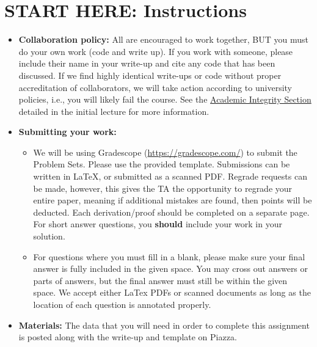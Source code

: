 \documentclass[11pt,addpoints,answers]{exam}
\numberwithin{equation}{section} %
\numberwithin{figure}{section} %
\numberwithin{table}{section} %
\begin{document}
\section*{START HERE: Instructions}
\begin{itemize}
    \item \textbf{Collaboration policy:} All are encouraged to work together, BUT you must do your own work (code and write up). If you work with someone, please include their name in your write-up and cite any code that has been discussed. If we find highly identical write-ups or code without proper accreditation of collaborators, we will take action according to university policies, i.e., you will likely fail the course. See the \href{https://www.dropbox.com/s/z6o0tinc9eaez46/L01_Overview.pdf?dl=0}{Academic Integrity Section} detailed in the initial lecture for more information.
          \item\textbf{Submitting your work:}
          \begin{itemize}
              \item We will be using Gradescope (\url{https://gradescope.com/}) to submit the Problem Sets. Please use the provided template. Submissions can be written in LaTeX, or submitted as a scanned PDF. Regrade requests can be made, however, this gives the TA the opportunity to regrade your entire paper, meaning if additional mistakes are found, then points will be deducted.
                    Each derivation/proof should be  completed on a separate page. For short answer questions, you \textbf{should} include your work in your solution.
              \item For questions where you must fill in a blank, please make sure your final answer is fully included in the given space. You may cross out answers or parts of answers, but the final answer must still be within the given space. We accept either LaTex PDFs or scanned documents as long as the location of each question is annotated properly.

          \end{itemize}
    \item \textbf{Materials:} The data that you will need in order to complete this assignment is posted along with the write-up and template on Piazza.
\end{itemize}


\clearpage
\end{document}
